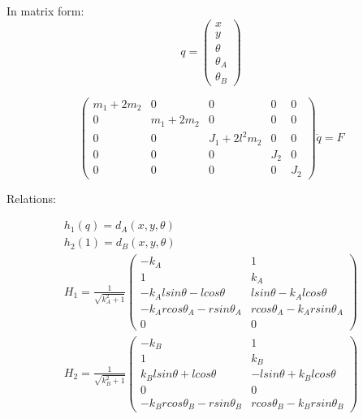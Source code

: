 \documentclass[12 pt]{article}
\begin{document}
In matrix form:
\begin{equation}
q=\begin{pmatrix}
x\\y\\ \theta \\ \theta_A \\ \theta_B
\end{pmatrix} 
\end{equation}

\begin{equation}
\begin{pmatrix} m_1+2m_2 & 0 & 0 & 0 & 0\\
               0 & m_1+2m_2 & 0 & 0 & 0\\
               0 & 0 & J_1+2l^2m_2& 0 & 0\\
               0& 0& 0& J_2 & 0 \\
               0 & 0 & 0& 0& J_2
\end{pmatrix}\ddot{q}=F
\end{equation}

Relations:

\begin{eqnarray}
&h_1(q)=d_A(x,y,\theta)& \\
&h_2(1)=d_B(x,y,\theta)&\\
&H_1=\frac{1}{\sqrt{k_A^2+1}}
\begin{pmatrix}
-k_A &1 \\
1 & k_A \\
 -k_Alsin\theta-lcos\theta & lsin\theta-k_Alcos\theta \\
 -k_Arcos\theta_A-rsin\theta_A & rcos\theta_A-k_Arsin\theta_A\\
0& 0 \end{pmatrix}&\\
&H_2=\frac{1}{\sqrt{k_B^2+1}}
\begin{pmatrix}
 -k_B & 1\\
1 & k_B  \\
k_Blsin\theta+lcos\theta & -lsin\theta+k_Blcos\theta\\
0& 0 \\
-k_Brcos\theta_B-rsin\theta_B & rcos\theta_B-k_Brsin\theta_B
 \end{pmatrix}&
\end{eqnarray}
\end{document}
